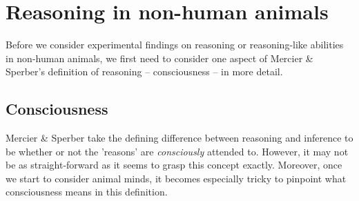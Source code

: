 
\section{Reasoning in non-human animals}
\label{sec:reasoning-nha}

Before we consider experimental findings on reasoning or reasoning-like abilities in non-human animals, we first need to consider one aspect of Mercier \& Sperber's definition of reasoning -- consciousness -- in more detail.

\subsection{Consciousness}

Mercier \& Sperber take the defining difference between reasoning and inference to be whether or not the 'reasons' are \emph{consciously} attended to. However, it may not be as straight-forward as it seems to grasp this concept exactly. Moreover, once we start to consider animal minds, it becomes especially tricky to pinpoint what consciousness means in this definition.

